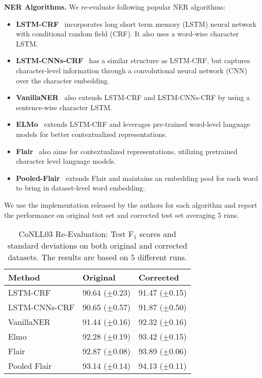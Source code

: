 \documentclass[11pt,a4paper]{article}
\newcommand{\smallsection}[1]{{\noindent\textbf{#1.}}}
\begin{document}
        \smallsection{NER Algorithms}
        We re-evaluate following popular NER algorithms:
        \begin{itemize}[leftmargin=*,nosep]
            \item \textbf{LSTM-CRF}~\cite{lample2016neural} incorporates long short term memory (LSTM) neural network with conditional random field (CRF). It also uses a word-wise character LSTM.
            \item \textbf{LSTM-CNNs-CRF}~\cite{ma2016end} has a similar structure as LSTM-CRF, but captures character-level information through a convolutional neural network (CNN) over the character embedding.
            \item \textbf{VanillaNER}~\cite{liu2018efficient} also extends LSTM-CRF and LSTM-CNNs-CRF by using a sentence-wise character LSTM. 
            \item \textbf{ELMo}~\cite{peters2018deep} extends LSTM-CRF and leverages pre-trained word-level language models for better contextualized representations.
            \item \textbf{Flair}~\cite{akbik2018contextual} also aims for contextualized representations, utilizing pretrained character level language models.
            \item \textbf{Pooled-Flair}~\cite{akbik2018contextual} extends Flair and maintains an embedding pool for each word to bring in dataset-level word embedding.
        \end{itemize}
        We use the implementation released  by the authors for each algorithm and report the performance on original test set and corrected test set averaging 5 runs.
        
\begin{table}[t]
\begin{center}
\small
\begin{tabularx}{\linewidth}{l *{2}{Y}}
\toprule
       \textbf{Method}   &  \textbf{Original} & \textbf{Corrected} \\ \midrule
LSTM-CRF & 90.64 ($\pm$0.23)& 91.47 ($\pm$0.15)\\
LSTM-CNNs-CRF & 90.65 ($\pm$0.57) & 91.87 ($\pm$0.50)\\
VanillaNER & 91.44 ($\pm$0.16) & 92.32 ($\pm$0.16) \\
Elmo & 92.28 ($\pm$0.19) & 93.42 ($\pm$0.15) \\
Flair & 92.87 ($\pm$0.08) & 93.89 ($\pm$0.06) \\
Pooled Flair & 93.14 ($\pm$0.14) &  94.13 ($\pm$0.11) \\
\bottomrule
\end{tabularx}
\end{center}
\vspace{-0.15cm}
\caption{CoNLL03 Re-Evaluation: Test F$_1$ scores and standard deviations on both original and corrected datasets. The results are based on $5$ different runs.}
\label{tbl:reevaluation}
\vspace{-0.4cm}
\end{table}
\end{document}
